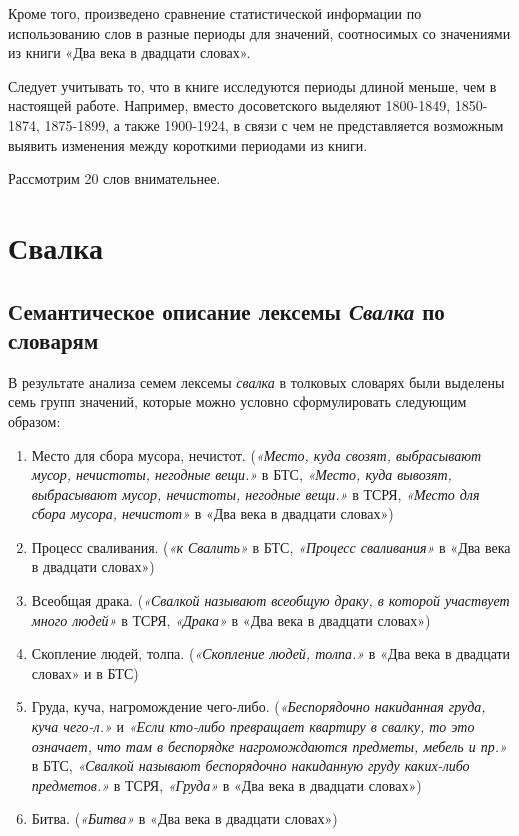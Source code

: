 \documentclass[LI,VKR]{HSEUniversity}
\begin{document}
Кроме того, произведено сравнение статистической информации по использованию слов
в разные периоды для значений, соотносимых со значениями из книги
«Два века в двадцати словах».

Следует учитывать то, что в книге исследуются периоды длиной меньше, чем в настоящей работе.
Например, вместо досоветского выделяют 1800-1849, 1850-1874, 1875-1899, а также 1900-1924,
в связи с чем не представляется возможным выявить изменения между короткими периодами из книги.

Рассмотрим 20 слов внимательнее.

\section*{Свалка}

\subsection*{Семантическое описание лексемы \textit{Свалка} по словарям}

В результате анализа семем лексемы \textit{свалка} в толковых словарях были
выделены семь групп значений, которые можно условно сформулировать
следующим образом:

\begin{enumerate}
    \item Место для сбора мусора, нечистот.
(\textit{«Место, куда свозят, выбрасывают мусор, нечистоты, негодные вещи.»} в БТС,
\textit{«Место, куда вывозят, выбрасывают мусор, нечистоты, негодные вещи.»} в ТСРЯ,
\textit{«Место для сбора мусора, нечистот»} в «Два века в двадцати словах»)
    \item Процесс сваливания.
(\textit{«к Свалить»} в БТС,
\textit{«Процесс сваливания»} в «Два века в двадцати словах»)
    \item Всеобщая драка.
(\textit{«Свалкой называют всеобщую драку, в которой участвует много людей»} в ТСРЯ,
\textit{«Драка»} в «Два века в двадцати словах»)
    \item Скопление людей, толпа.
(\textit{«Скопление людей, толпа.»} в «Два века в двадцати словах» и в БТС)
    \item Груда, куча, нагромождение чего-либо.
(\textit{«Беспорядочно накиданная груда, куча чего-л.»} и
\textit{«Если кто-либо превращает квартиру в свалку, то это означает, что там в беспорядке нагромождаются предметы, мебель и пр.»} в БТС,
\textit{«Свалкой называют беспорядочно накиданную груду каких-либо предметов.»} в ТСРЯ,
\textit{«Груда»} в «Два века в двадцати словах»)
    \item Битва.
(\textit{«Битва»} в «Два века в двадцати словах»)
\end{enumerate}
\end{document}
